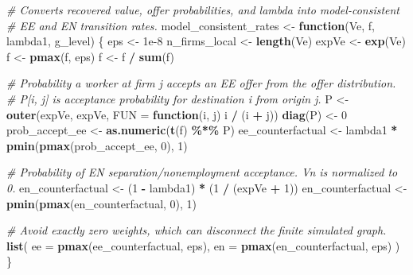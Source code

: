 \documentclass[
]{article}
\newenvironment{Shaded}{\begin{snugshade}}{\end{snugshade}}
\newcommand{\AttributeTok}[1]{\textcolor[rgb]{0.13,0.29,0.53}{#1}}
\newcommand{\CommentTok}[1]{\textcolor[rgb]{0.56,0.35,0.01}{\textit{#1}}}
\newcommand{\ControlFlowTok}[1]{\textcolor[rgb]{0.13,0.29,0.53}{\textbf{#1}}}
\newcommand{\DecValTok}[1]{\textcolor[rgb]{0.00,0.00,0.81}{#1}}
\newcommand{\FloatTok}[1]{\textcolor[rgb]{0.00,0.00,0.81}{#1}}
\newcommand{\FunctionTok}[1]{\textcolor[rgb]{0.13,0.29,0.53}{\textbf{#1}}}
\newcommand{\NormalTok}[1]{#1}
\newcommand{\OtherTok}[1]{\textcolor[rgb]{0.56,0.35,0.01}{#1}}
\newcommand{\SpecialCharTok}[1]{\textcolor[rgb]{0.81,0.36,0.00}{\textbf{#1}}}
\begin{document}
\begin{Shaded}
\begin{Highlighting}[]
\CommentTok{\# Converts recovered value, offer probabilities, and lambda into model{-}consistent}
\CommentTok{\# EE and EN transition rates.}
\NormalTok{model\_consistent\_rates }\OtherTok{\textless{}{-}} \ControlFlowTok{function}\NormalTok{(Ve, f, lambda1, g\_level) \{}
\NormalTok{    eps }\OtherTok{\textless{}{-}} \FloatTok{1e{-}8}
\NormalTok{    n\_firms\_local }\OtherTok{\textless{}{-}} \FunctionTok{length}\NormalTok{(Ve)}
\NormalTok{    expVe }\OtherTok{\textless{}{-}} \FunctionTok{exp}\NormalTok{(Ve)}
\NormalTok{    f }\OtherTok{\textless{}{-}} \FunctionTok{pmax}\NormalTok{(f, eps)}
\NormalTok{    f }\OtherTok{\textless{}{-}}\NormalTok{ f }\SpecialCharTok{/} \FunctionTok{sum}\NormalTok{(f)}

    \CommentTok{\# Probability a worker at firm j accepts an EE offer from the offer distribution.}
    \CommentTok{\# P[i, j] is acceptance probability for destination i from origin j.}
\NormalTok{    P }\OtherTok{\textless{}{-}} \FunctionTok{outer}\NormalTok{(expVe, expVe, }\AttributeTok{FUN =} \ControlFlowTok{function}\NormalTok{(i, j) i }\SpecialCharTok{/}\NormalTok{ (i }\SpecialCharTok{+}\NormalTok{ j))}
    \FunctionTok{diag}\NormalTok{(P) }\OtherTok{\textless{}{-}} \DecValTok{0}
\NormalTok{    prob\_accept\_ee }\OtherTok{\textless{}{-}} \FunctionTok{as.numeric}\NormalTok{(}\FunctionTok{t}\NormalTok{(f) }\SpecialCharTok{\%*\%}\NormalTok{ P)}
\NormalTok{    ee\_counterfactual }\OtherTok{\textless{}{-}}\NormalTok{ lambda1 }\SpecialCharTok{*} \FunctionTok{pmin}\NormalTok{(}\FunctionTok{pmax}\NormalTok{(prob\_accept\_ee, }\DecValTok{0}\NormalTok{), }\DecValTok{1}\NormalTok{)}

    \CommentTok{\# Probability of EN separation/nonemployment acceptance. Vn is normalized to 0.}
\NormalTok{    en\_counterfactual }\OtherTok{\textless{}{-}}\NormalTok{ (}\DecValTok{1} \SpecialCharTok{{-}}\NormalTok{ lambda1) }\SpecialCharTok{*}\NormalTok{ (}\DecValTok{1} \SpecialCharTok{/}\NormalTok{ (expVe }\SpecialCharTok{+} \DecValTok{1}\NormalTok{))}
\NormalTok{    en\_counterfactual }\OtherTok{\textless{}{-}} \FunctionTok{pmin}\NormalTok{(}\FunctionTok{pmax}\NormalTok{(en\_counterfactual, }\DecValTok{0}\NormalTok{), }\DecValTok{1}\NormalTok{)}

    \CommentTok{\# Avoid exactly zero weights, which can disconnect the finite simulated graph.}
    \FunctionTok{list}\NormalTok{(}
        \AttributeTok{ee =} \FunctionTok{pmax}\NormalTok{(ee\_counterfactual, eps),}
        \AttributeTok{en =} \FunctionTok{pmax}\NormalTok{(en\_counterfactual, eps)}
\NormalTok{    )}
\NormalTok{\}}


\end{Highlighting}
\end{Shaded}
\end{document}
